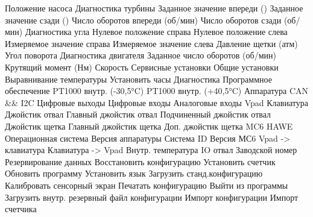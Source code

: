  {Положение насоса}
 {Диагностика турбины}
 {Заданное значение впереди (\percent )}
 {Заданное значение сзади (\percent )}
 {Число оборотов впереди (об/мин)}
 {Число оборотов сзади (об/мин)}
 {Диагностика угла}
 {Нулевое положение справа}
 {Нулевое положение слева}
 {Измеряемое значение справа}
 {Измеряемое значение слева}
 {Давление щетки (атм)}
 {Угол поворота}
 {Диагностика двигателя}
 {Заданное число оборотов (об/мин)}
 {Крутящий момент (Нм)}
 {Скорость}
 {Сервисные установки}
 {Общие установки}
 {Выравнивание температуры}
 {Установить часы}
 {Диагностика}
 {Программное обеспечение}
 {PT1000 внутр. (-30,5°C)}
 {PT1000 внутр.  (+40,5°C)}
 {Аппаратура}
 {CAN \&\& I2C}
 {Цифровые выходы}
 {Цифровые входы}
 {Аналоговые входы}
 {Vpad}
 {Клавиатура}
 {Джойстик отвал}
 {Главный джойстик отвал}
 {Подчиненный джойстик отвал}
 {Джойстик щетка}
 {Главный джойстик щетка}
 {Доп. джойстик щетка}
 {MC6}
 {HAWE}
 {Операционная система}
 {Версия аппаратуры}
 {Система  ID}
 {Версия МС6}
 {Vpad -> клавиатура}
 {Клавиатура -> Vpad}
 {Внутр. температура}
 {IO отвал}
 {Заводской номер}
 {Резервирование данных}
 {Восстановить конфигурацию}
 {Установить счетчик}
 {Обновить программу}
 {Установить язык}
 {Загрузить станд.конфигурацию}
 {Калибровать сенсорный экран}
 {Печатать конфигурацию}
 {Выйти из программы}
 {Загрузить внутр. резервный файл конфигурации}
 {Импорт конфигурации}
 {Импорт счетчика}

